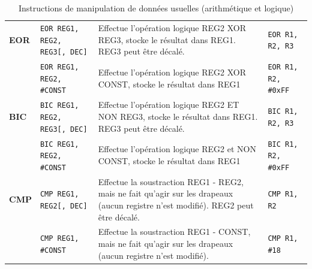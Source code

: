 \documentclass{tufte-handout}
\begin{document}
\begin{table}
\begin{tabular}{l|l|p{7.5cm}l}
\hline
\textbf{EOR} & \texttt{EOR REG1, REG2, REG3[, DEC]} 	& Effectue l'opération logique REG2 XOR REG3, stocke le résultat dans REG1. REG3 peut être décalé. & \texttt{EOR R1, R2, R3} \\
 			 & \texttt{EOR REG1, REG2, \#CONST} 			& Effectue l'opération logique REG2 XOR CONST, stocke le résultat dans REG1 & \texttt{EOR R1, R2, \#0xFF} \\
\hline
\textbf{BIC} & \texttt{BIC REG1, REG2, REG3[, DEC]} 	& Effectue l'opération logique REG2 ET NON REG3, stocke le résultat dans REG1. REG3 peut être décalé. & \texttt{BIC R1, R2, R3} \\
 			 & \texttt{BIC REG1, REG2, \#CONST} 			& Effectue l'opération logique REG2 et NON CONST, stocke le résultat dans REG1 & \texttt{BIC R1, R2, \#0xFF} \\
\hline
\textbf{CMP} & \texttt{CMP REG1, REG2[, DEC]} 	& Effectue la soustraction REG1 - REG2, mais ne fait qu'agir sur les drapeaux (aucun registre n'est modifié). REG2 peut être décalé. & \texttt{CMP R1, R2} \\
 			 & \texttt{CMP REG1, \#CONST} 			& Effectue la soustraction REG1 - CONST, mais ne fait qu'agir sur les drapeaux (aucun registre n'est modifié). & \texttt{CMP R1, \#18} \\

\end{tabular}
\caption{Instructions de manipulation de données usuelles (arithmétique et logique)}
\end{table}
\end{document}
